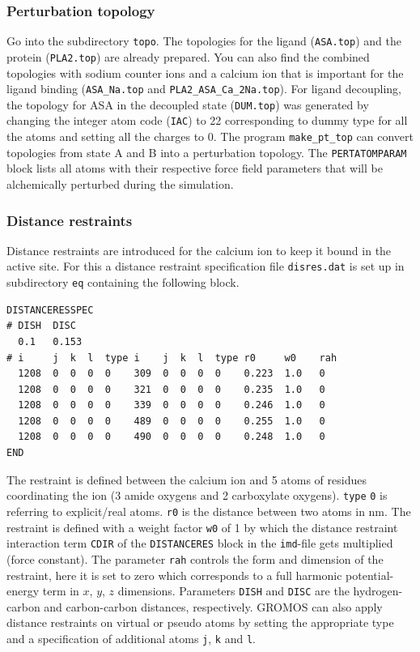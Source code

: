 \subsubsection{Perturbation topology}
Go into the subdirectory \texttt{topo}. The topologies for the ligand (\texttt{ASA.top}) and the protein (\texttt{PLA2.top}) are already prepared. You can also find the combined topologies with sodium counter ions and a calcium ion that is important for the ligand binding (\texttt{ASA\_Na.top} and \texttt{PLA2\_ASA\_Ca\_2Na.top}). For ligand decoupling, the topology for ASA in the decoupled state (\texttt{DUM.top}) was generated by changing the integer atom code (\texttt{IAC}) to 22 corresponding to dummy type for all the atoms and setting all the charges to 0. The program \texttt{make\_pt\_top} can convert topologies from state A and B into a perturbation topology. The \texttt{PERTATOMPARAM} block lists all atoms with their respective force field parameters that will be alchemically perturbed during the simulation. 

\subsubsection{Distance restraints}
Distance restraints are introduced for the calcium ion to keep it bound in the active site. For this a distance restraint specification file \texttt{disres.dat} is set up in subdirectory \texttt{eq} containing the following block.
\begin{lstlisting}[columns=flexible]
DISTANCERESSPEC
# DISH  DISC
  0.1   0.153
# i     j  k  l  type i    j  k  l  type r0     w0    rah
  1208  0  0  0  0    309  0  0  0  0    0.223  1.0   0
  1208  0  0  0  0    321  0  0  0  0    0.235  1.0   0
  1208  0  0  0  0    339  0  0  0  0    0.246  1.0   0
  1208  0  0  0  0    489  0  0  0  0    0.255  1.0   0
  1208  0  0  0  0    490  0  0  0  0    0.248  1.0   0
END
\end{lstlisting}
The restraint is defined between the calcium ion and 5 atoms of residues coordinating the ion (3 amide oxygens and 2 carboxylate oxygens). \texttt{type} \texttt{0} is referring to explicit/real atoms. \texttt{r0} is the distance between two atoms in nm. The restraint is defined with a weight factor \texttt{w0} of 1 by which the distance restraint interaction term \texttt{CDIR} of the \texttt{DISTANCERES} block in the \texttt{imd}-file gets multiplied (force constant). The parameter \texttt{rah} controls the form and dimension of the restraint, here it is set to zero which corresponds to a full harmonic potential-energy term in $x$, $y$, $z$ dimensions. Parameters \texttt{DISH} and \texttt{DISC} are the hydrogen-carbon and carbon-carbon distances, respectively. GROMOS can also apply distance restraints on virtual or pseudo atoms by setting the appropriate type and a specification of additional atoms \texttt{j}, \texttt{k} and \texttt{l}. \\

